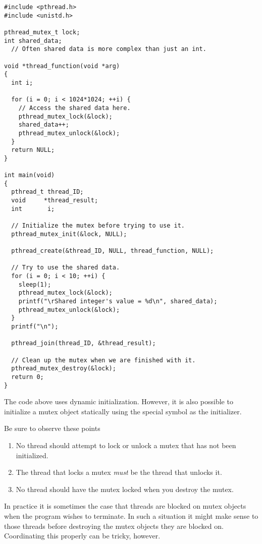 \begin{lstlisting}[float=tp,frame=single,xleftmargin=0in, caption={Mutex
Example},label=lst:mutex-example]
#include <pthread.h>
#include <unistd.h>

pthread_mutex_t lock;
int shared_data;
  // Often shared data is more complex than just an int.

void *thread_function(void *arg)
{
  int i;

  for (i = 0; i < 1024*1024; ++i) {
    // Access the shared data here.
    pthread_mutex_lock(&lock);
    shared_data++;
    pthread_mutex_unlock(&lock);
  }
  return NULL;
}

int main(void)
{
  pthread_t thread_ID;
  void     *thread_result;
  int       i;

  // Initialize the mutex before trying to use it.
  pthread_mutex_init(&lock, NULL);

  pthread_create(&thread_ID, NULL, thread_function, NULL);

  // Try to use the shared data.
  for (i = 0; i < 10; ++i) {
    sleep(1);
    pthread_mutex_lock(&lock);
    printf("\rShared integer's value = %d\n", shared_data);
    pthread_mutex_unlock(&lock);
  }
  printf("\n");

  pthread_join(thread_ID, &thread_result);

  // Clean up the mutex when we are finished with it.
  pthread_mutex_destroy(&lock);
  return 0;
}
\end{lstlisting}

The code above uses dynamic initialization. However, it is also possible to initialize a mutex
object statically using the special symbol  as the
initializer.

Be sure to observe these points

\begin{enumerate}

\item No thread should attempt to lock or unlock a mutex that has not been initialized.

\item The thread that locks a mutex \emph{must} be the thread that unlocks it.

\item No thread should have the mutex locked when you destroy the mutex.

\end{enumerate}

In practice it is sometimes the case that threads are blocked on mutex objects when the program
wishes to terminate. In such a situation it might make sense to 
those threads before destroying the mutex objects they are blocked on. Coordinating this
properly can be tricky, however.


